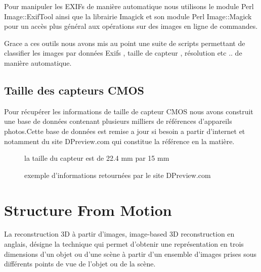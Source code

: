 \documentclass[a4paper,10pt,french]{sphinxhowto}
\begin{document}
Pour manipuler les EXIFs de manière automatique nous utilisons le module Perl Image::ExifTool ainsi que la librairie Imagick et son module Perl Image::Magick pour un accès plus général aux opérations sur des images en ligne de commandes.

Grace a ces outils nous avons mis au point une suite de scripts permettant de classifier les images par données Exifs , taille de capteur , résolution etc .. de manière automatique.


\subsection{\textbf{Taille des capteurs CMOS}}
\label{collection:taille-des-capteurs-cmos}
Pour récupérer les informations de taille de capteur CMOS nous avons construit une base de données contenant plusieurs milliers de références d'appareils photos.Cette base de données est remise a jour si besoin a partir d'internet et notamment du site DPreview.com qui constitue la référence en la matière.
\begin{figure}[htbp]
\centering
\capstart

\caption{exemple d'informations retournées par le site DPreview.com}{\small 
la taille du capteur est de 22.4 mm par 15 mm
}\end{figure}


\section{Structure From Motion}
\label{Sfm:structure-from-motion}\label{Sfm::doc}
La reconstruction 3D à partir d'images, image-based 3D reconstruction en anglais, désigne la technique qui permet d'obtenir une représentation en trois dimensions d'un objet ou d'une scène à partir d'un ensemble d'images prises sous différents points de vue de l'objet ou de la scène.
\end{document}
